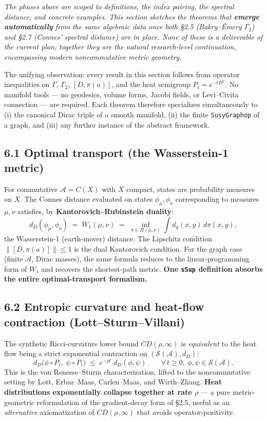 \documentclass[
  11pt,
]{article}
\begin{document}
\emph{The phases above are scoped to definitions, the index pairing, the
spectral distance, and concrete examples. This section sketches the
theorems that \textbf{emerge automatically} from the same algebraic data
once both §2.5 (Bakry--Émery \(\Gamma_2\)) and §2.7 (Connes' spectral
distance) are in place. None of these is a deliverable of the current
plan; together they are the natural research-level continuation,
encompassing modern noncommutative metric geometry.}

The unifying observation: every result in this section follows from
operator inequalities on \(\Gamma\), \(\Gamma_2\), \([D, \pi(a)]\), and
the heat semigroup \(P_t = e^{-tD^2}\). No manifold tools --- no
geodesics, volume forms, Jacobi fields, or Levi--Civita connection ---
are required. Each theorem therefore specializes simultaneously to (i)
the canonical Dirac triple of a smooth manifold, (ii) the finite
\texttt{SusyGraphop} of a graph, and (iii) any further instance of the
abstract framework.

\subsection{6.1 Optimal transport (the Wasserstein-1
metric)}\label{optimal-transport-the-wasserstein-1-metric}

For commutative \(\mathcal{A}= C(X)\) with \(X\) compact, states are
probability measures on \(X\). The Connes distance evaluated on states
\(\phi_\mu, \phi_\nu\) corresponding to measures \(\mu, \nu\) satisfies,
by \textbf{Kantorovich--Rubinstein duality}: \[
d_D(\phi_\mu, \phi_\nu) \;=\; W_1(\mu, \nu)
\;=\; \inf_{\pi \in \Pi(\mu, \nu)} \int d_g(x, y)\,d\pi(x, y),
\] the Wasserstein-1 (earth-mover) distance. The Lipschitz condition
\(\|[D, \pi(a)]\| \leq 1\) is the dual Kantorovich condition. For the
graph case (finite \(\mathcal{A}\), Dirac masses), the same formula
reduces to the linear-programming form of \(W_1\) and recovers the
shortest-path metric. \textbf{One \texttt{sSup} definition absorbs the
entire optimal-transport formalism.}

\subsection{6.2 Entropic curvature and heat-flow contraction
(Lott--Sturm--Villani)}\label{entropic-curvature-and-heat-flow-contraction-lottsturmvillani}

The synthetic Ricci-curvature lower bound \(CD(\rho, \infty)\) is
\emph{equivalent} to the heat flow being a strict exponential
contraction on \((\mathcal{S}(\mathcal{A}), d_D)\): \[
d_D\bigl(\phi \circ P_t,\;\psi \circ P_t\bigr) \;\leq\; e^{-\rho t}\;d_D(\phi, \psi)
\qquad \forall\, t \geq 0,\ \phi, \psi \in \mathcal{S}(\mathcal{A}).
\] This is the von Renesse--Sturm characterization, lifted to the
noncommutative setting by Lott, Erbar--Maas, Carlen--Maas, and
Wirth--Zhang. \textbf{Heat distributions exponentially collapse together
at rate \(\rho\)} --- a pure metric-geometric reformulation of the
gradient-decay form of §2.5, useful as an \emph{alternative}
axiomatization of \(CD(\rho, \infty)\) that avoids operator-positivity.
\end{document}
